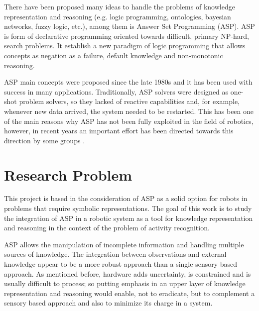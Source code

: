 There have been proposed many ideas to handle the problems of knowledge representation and reasoning (e.g. logic programming, ontologies, bayesian networks, fuzzy logic, etc.), among them is Answer Set Programming (ASP).
ASP is form of declarative programming oriented towards difficult, primary NP-hard, search problems.
It establish a new paradigm of logic programming that allows concepts as negation as a failure, default knowledge and non-monotonic reasoning.

ASP main concepts were proposed since the late 1980s \citep{Gelf88a} and it has been used with success in many applications.
Traditionally, ASP solvers were designed as one-shot problem solvers, so they lacked of reactive capabilities and, for example, whenever new data arrived, the system needed to be restarted.
This has been one of the main reasons why ASP has not been fully exploited in the field of robotics, however, in recent years an important effort has been directed towards this direction by some groups \citep{AndresOSSR13_rosoclingo,Erdem2013_IntLowRTaskP}.


\section{Research Problem}

This project is based in the consideration of ASP as a solid option for robots in problems that require symbolic representations.
The goal of this work is to study the integration of ASP in a robotic system as a tool for knowledge representation and reasoning in the context of the problem of activity recognition.

ASP allows the manipulation of incomplete information and handling multiple sources of knowledge.
The integration between observations and external knowledge appear to be a more robust approach than a single sensory based approach.
As mentioned before, hardware adds uncertainty, is constrained and is usually difficult to process; so putting emphasis in an upper layer of knowledge representation and reasoning would enable, not to eradicate, but to complement a sensory based approach and also to minimize its charge in a system.




